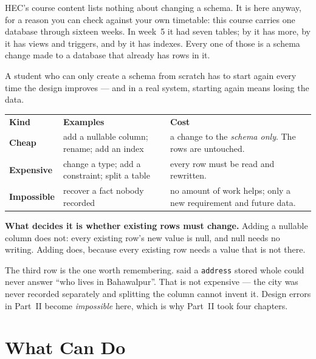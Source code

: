 HEC's course content lists nothing about changing a schema. It is here anyway,
for a reason you can check against your own timetable: this course carries one
database through sixteen weeks. In week~5 it had seven tables; by
 it has more, by  it has views and triggers,
and by  it has indexes. Every one of those is a schema change
made to a database that already has rows in it.

A student who can only create a schema from scratch has to start again every
time the design improves --- and in a real system, starting again means losing
the data.

\begin{conceptbox}
\begin{tabular}{@{}L{3.6cm}L{4.6cm}L{5.8cm}@{}}
\textbf{Kind} & \textbf{Examples} & \textbf{Cost} \\
\textbf{Cheap} & add a nullable column; rename; add an index &
  a change to the \emph{schema only}. The rows are untouched. \\
\textbf{Expensive} & change a type; add a constraint; split a table &
  every row must be read and rewritten. \\
\textbf{Impossible} & recover a fact nobody recorded &
  no amount of work helps; only a new requirement and future data. \\
\end{tabular}

\smallskip
\textbf{What decides it is whether existing rows must change.} Adding a
nullable column does not: every existing row's new value is null, and null
needs no writing. Adding  does, because every existing row
needs a value that is not there.

\smallskip
The third row is the one worth remembering.  said a
\texttt{address} stored whole could never answer ``who lives in Bahawalpur''.
That is not expensive --- the city was never recorded separately and splitting
the column cannot invent it. Design errors in Part~II become \emph{impossible}
here, which is why Part~II took four chapters.
\end{conceptbox}

\section{What  Can Do}


